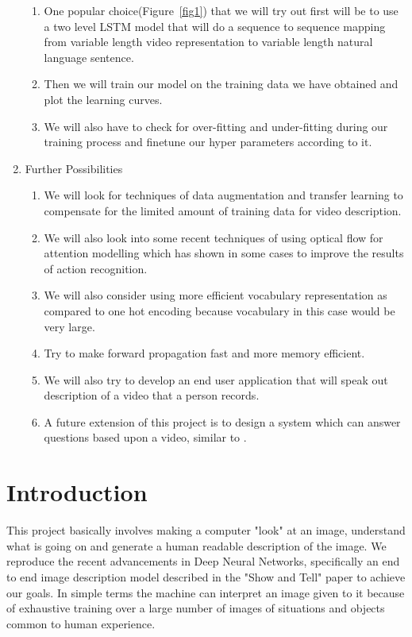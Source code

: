 \documentclass[11pt]{article}
\begin{document}
\begin{enumerate}
\begin{enumerate}
				\item
					One popular choice\cite{s2vt}(Figure~\ref{fig1}) that we will try out first will be to use a two level LSTM model that will do a sequence to sequence mapping from variable length video representation to variable length natural language sentence.
				\item
					Then we will train our model on the training data we have obtained and plot the learning curves.
				\item
					We will also have to check for over-fitting and under-fitting during our training process and finetune our hyper parameters according to it.
			\end{enumerate}
			\item Further Possibilities
			\begin{enumerate}
				\item We will look for techniques of data augmentation and transfer learning\cite{proposal} to compensate for the limited amount of training data for video description.
				\item We will also look into some recent techniques of using optical flow for attention modelling\cite{s2vt} which has shown in some cases to improve the results of action recognition.
				\item We will also consider using more efficient vocabulary representation as compared to one hot encoding because vocabulary in this case would be very large.
				\item Try to make forward propagation fast and more memory efficient.
				\item We will also try to develop an end user application that will speak out description of a video that a person records.
				\item A future extension of this project is to design a system which can answer questions based upon a video, similar to \cite{visualqa}.
			\end{enumerate}
		\end{enumerate}

	\section{Introduction}
	
	This project basically involves making a computer "look" at an image, understand what is going on and generate a human readable description of the image. We reproduce the recent advancements in Deep Neural Networks, specifically an end to end image description model described in the "Show and Tell" paper to achieve our goals. In simple terms the machine can interpret an image given to it because of exhaustive training over a large number of images of situations and objects common to human experience. 
\end{document}
